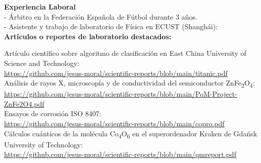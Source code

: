 \documentclass{report}
\begin{document}
\Large{
\textbf{Experiencia Laboral}\\

\noindent
- Árbitro en la Federación Española de Fútbol durante 3 años.\\
- Asistente y trabajo de laboratorio de Física en ECUST (Shanghái):\\





\textbf{Artículos o reportes de laboratorio destacados:}\\

\noindent

Artículo científico sobre algoritmo de clasificación en East China University of Science and Technology: \\
\url{https://github.com/jesus-moral/scientific-reports/blob/main/titanic.pdf}\\

Análisis de rayos X, microscopía y de conductividad del semiconductor ZnFe\textsubscript{2}O\textsubscript{4}:\\
\large{
\url{https://github.com/jesus-moral/scientific-reports/blob/main/PoM-Project-ZnFe2O4.pdf}}\\

Ensayos de corrosión ISO 8407:\\
\url{https://github.com/jesus-moral/scientific-reports/blob/main/copro.pdf}\\

Cálculos cuánticos de la molécula Co\textsubscript{4}O\textsubscript{6} en el superordenador Kraken de Gdańsk University of Technology:\\
\url{https://github.com/jesus-moral/scientific-reports/blob/main/qmreport.pdf}
}
\end{document}
